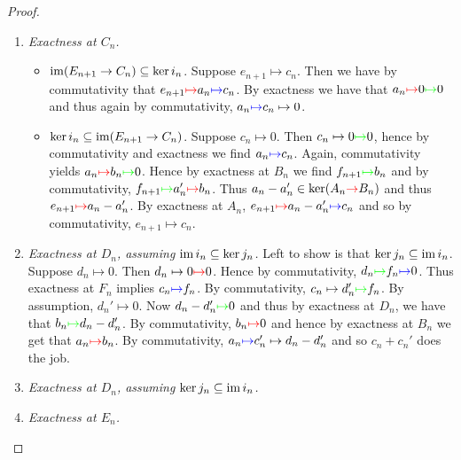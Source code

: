 \begin{proof}
	\begin{enumerate}[label = \textit{Step \arabic*:}, wide = 0pt]
		\item \textit{Exactness at $C_n$.} 
			\begin{itemize}[wide = 0pt]
				\item $\operatorname{im}(E_{n + 1} \to C_n) \subseteq \ker i_n$. Suppose $e_{n + 1} \mapsto c_n$. Then we have by commutativity that $e_{n + 1} \textcolor{red}{\mapsto} a_n \textcolor{blue}{\mapsto} c_n$. By exactness we have that $a_n \textcolor{red}{\mapsto} 0 \textcolor{green}{\mapsto} 0$ and thus again by commutativity, $a_n \textcolor{blue}{\mapsto} c_n \mapsto 0$. 
				\item $\ker i_n \subseteq \operatorname{im} (E_{n + 1} \to C_n)$. Suppose $c_n \mapsto 0$. Then $c_n \mapsto 0 \textcolor{green}{\mapsto} 0$, hence by commutativity and exactness we find $a_n \textcolor{blue}{\mapsto} c_n$. Again, commutativity yields $a_n \textcolor{red}{\mapsto} b_n \textcolor{green}{\mapsto} 0$. Hence by exactness at $B_n$ we find $f_{n + 1} \textcolor{green}{\mapsto} b_n$ and by commutativity, $f_{n + 1} \textcolor{green}{\mapsto} a_n' \textcolor{red}{\mapsto} b_n$. Thus $a_n - a_n' \in \ker(A_n \textcolor{red}{\to} B_n)$ and thus $e_{n + 1} \textcolor{red}{\mapsto} a_n - a_n'$. By exactness at $A_n$, $e_{n + 1} \textcolor{red}{\mapsto} a_n - a_n' \textcolor{blue}{\mapsto} c_n$ and so by commutativity, $e_{n + 1} \mapsto c_n$. 
			\end{itemize}
		\item \textit{Exactness at $D_n$, assuming $\operatorname{im} i_n \subseteq \ker j_n$.} Left to show is that $\ker j_n \subseteq \operatorname{im} i_n$. Suppose $d_n \mapsto 0$. Then $d_n\mapsto 0 \textcolor{red}{\mapsto} 0$. Hence by commutativity, $d_n \textcolor{green}{\mapsto} f_n \textcolor{blue}{\mapsto} 0$. Thus exactness at $F_n$ implies $c_n \textcolor{blue}{\mapsto} f_n$. By commutativity, $c_n \mapsto d_n' \textcolor{green}{\mapsto} f_n$. By assumption, $d_n' \mapsto 0$. Now $d_n - d_n' \textcolor{green}{\mapsto} 0$ and thus by exactness at $D_n$, we have that $b_n \textcolor{green}{\mapsto} d_n - d_n'$. By commutativity, $b_n \textcolor{red}{\mapsto} 0$ and hence by exactness at $B_n$ we get that $a_n \textcolor{red}{\mapsto} b_n$. By commutativity, $a_n \textcolor{blue}{\mapsto} c_n' \mapsto d_n - d_n'$ and so $c_n + c_n'$ does the job.
		\item \textit{Exactness at $D_n$, assuming $\ker j_n \subseteq \operatorname{im} i_n$.} 
		\item \textit{Exactness at $E_n$.} 

\end{enumerate}
\end{proof}

